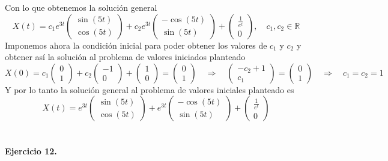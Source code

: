 \documentclass[fleqn]{article}
\def\R{\mathds{R}}
\def\next{\quad \Rightarrow \quad}
\begin{document}
    Con lo que obtenemos la solución general
    $$
    X(t) = 
    c_1e^{3t}
    \begin{pmatrix}
        \sin(5t) \\
        \cos(5t)
    \end{pmatrix}
    +c_2e^{3t}
    \begin{pmatrix}
        -\cos(5t)\\
        \sin(5t)
    \end{pmatrix}
    +
    \begin{pmatrix}
        \frac{1}{e^{t}} \\ 0
    \end{pmatrix}
    , \quad c_1,c_2 \in \R
    $$
    Imponemos ahora la condición inicial para poder obtener los valores de $c_1$ y $c_2$ y obtener así la solución al problema de valores iniciados planteado
    $$X(0)=
    c_1
    \begin{pmatrix}
        0 \\ 1
    \end{pmatrix}
    + c_2
    \begin{pmatrix}
        -1 \\ 0
    \end{pmatrix}
    +
    \begin{pmatrix}
        1 \\ 0
    \end{pmatrix}
    =
    \begin{pmatrix}
        0 \\ 1
    \end{pmatrix}
    \next 
    \begin{pmatrix}
        -c_2 +1 \\ c_1
    \end{pmatrix}
    =
    \begin{pmatrix}
        0 \\ 1
    \end{pmatrix}
    \next c_1=c_2=1
    $$
    Y por lo tanto la solución general al problema de valores iniciales planteado es
    $$
    X(t) = 
    e^{3t}
    \begin{pmatrix}
        \sin(5t) \\
        \cos(5t)
    \end{pmatrix}
    +e^{3t}
    \begin{pmatrix}
        -\cos(5t)\\
        \sin(5t)
    \end{pmatrix}
    +
    \begin{pmatrix}
        \frac{1}{e^{t}} \\ 0
    \end{pmatrix}
    $$\\ \\

    \textbf{Ejercicio 12. } \\
\end{document}
